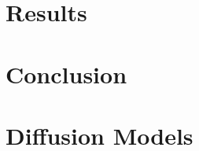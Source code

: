 \documentclass[ oneside,%
                    author={George Herbert},
                    degree={MSci},
                     title={Video Diffusion Models for Climate Simulations},
                  subtitle={}]{dissertation}
\begin{document}

\chapter{Results}
\label{chap:results}


\chapter{Conclusion}
\label{chap:conclusion}


%
%
%

\backmatter





\appendix

\chapter{Diffusion Models}
\label{appx:diffusion}
\end{document}
